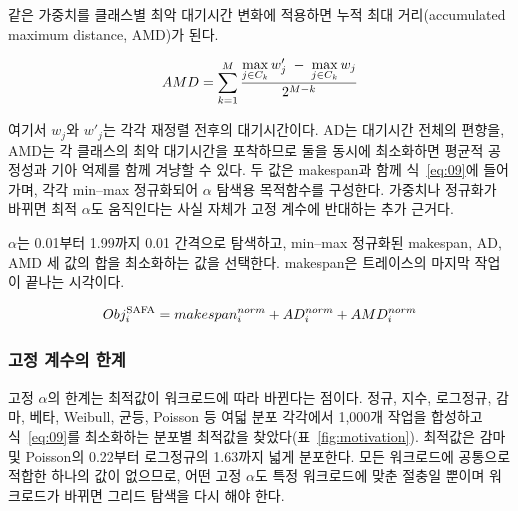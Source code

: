 \documentclass{ieeetj}
\begin{document}
같은 가중치를 클래스별 최악 대기시간 변화에 적용하면 누적 최대 거리(accumulated maximum distance, AMD)가 된다.

\begin{equation}
AMD = \sum_{k=1}^{M} \frac{\max\limits_{j\in C_k} w'_j \;-\; \max\limits_{j\in C_k} w_j}{2^{M-k}}
\label{eq:08}
\vspace{2pt}
\end{equation}

여기서 $w_j$와 $w'_j$는 각각 재정렬 전후의 대기시간이다. AD는 대기시간 전체의 편향을, AMD는 각 클래스의 최악 대기시간을 포착하므로 둘을 동시에 최소화하면 평균적 공정성과 기아 억제를 함께 겨냥할 수 있다. 두 값은 makespan과 함께 식~\eqref{eq:09}에 들어가며, 각각 min--max 정규화되어 $\alpha$ 탐색용 목적함수를 구성한다. 가중치나 정규화가 바뀌면 최적 $\alpha$도 움직인다는 사실 자체가 고정 계수에 반대하는 추가 근거다.

$\alpha$는 0.01부터 1.99까지 0.01 간격으로 탐색하고, min--max 정규화된 makespan, AD, AMD 세 값의 합을 최소화하는 값을 선택한다. makespan은 트레이스의 마지막 작업이 끝나는 시각이다.

\begin{equation}
Obj_i^{\text{SAFA}} = makespan_i^{norm} + AD_i^{norm} + AMD_i^{norm}
\label{eq:09}
\vspace{2pt}
\end{equation}

\subsubsection{고정 계수의 한계}\label{coeff:limit}
고정 $\alpha$의 한계는 최적값이 워크로드에 따라 바뀐다는 점이다. 정규, 지수, 로그정규, 감마, 베타, Weibull, 균등, Poisson 등 여덟 분포 각각에서 1,000개 작업을 합성하고 식~\eqref{eq:09}를 최소화하는 분포별 최적값을 찾았다(표~\ref{fig:motivation}). 최적값은 감마 및 Poisson의 0.22부터 로그정규의 1.63까지 넓게 분포한다. 모든 워크로드에 공통으로 적합한 하나의 값이 없으므로, 어떤 고정 $\alpha$도 특정 워크로드에 맞춘 절충일 뿐이며 워크로드가 바뀌면 그리드 탐색을 다시 해야 한다.

\begin{table}[htb!]
\centering
\caption{분포별 최적 $\alpha$}
\label{fig:motivation}
\footnotesize
\setlength{\tabcolsep}{4pt}
\end{table}
\end{document}
